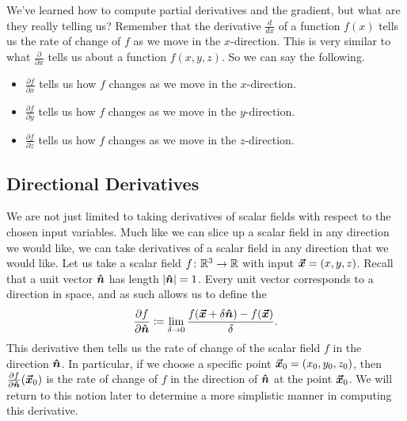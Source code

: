                         We've learned how to compute partial derivatives and the gradient, but what are they really telling us? Remember that the derivative $\frac{d}{dx}$ of a function $f(x)$ tells us the rate of change of $f$ as we move in the $x$-direction.  This is very similar to what $\frac{\partial}{\partial x}$ tells us about a function $f(x,y,z)$.  So we can say the following.
                        \begin{itemize}
                            \item $\frac{\partial f}{\partial x}$ tells us how $f$ changes as we move in the $x$-direction.
                            \item $\frac{\partial f}{\partial y}$ tells us how $f$ changes as we move in the $y$-direction.
                            \item $\frac{\partial f}{\partial z}$ tells us how $f$ changes as we move in the $z$-direction.
                        \end{itemize}   
                        
                        \subsection{Directional Derivatives}
                        
                        We are not just limited to taking derivatives of scalar fields with respect to the chosen input variables. Much like we can slice up a scalar field in any direction we would like, we can take derivatives of a scalar field in any direction that we would like. Let us take a scalar field $f \colon \mathbb{R}^3 \to \mathbb{R}$ with input $\boldsymbol{\vec{x}} = (x,y,z)$. Recall that a unit vector $\boldsymbol{\hat{n}}$ has length $|\boldsymbol{\hat{n}}|=1$. Every unit vector corresponds to a direction in space, and as such allows us to define the  
\[
\frac{\partial f}{\partial \boldsymbol{\hat{n}}} \coloneqq \lim_{\delta \to 0} \frac{f(\boldsymbol{\vec{x}}+\delta \boldsymbol{\hat{n}})-f(\boldsymbol{\vec{x}})}{\delta}.
\]
                This derivative then tells us the rate of change of the scalar field $f$ in the direction $\boldsymbol{\hat{n}}$. In particular, if we choose a specific point $\boldsymbol{\vec{x}}_0 = (x_0,y_0,z_0)$, then $\frac{\partial f}{\partial \boldsymbol{\hat{n}}}(\boldsymbol{\vec{x}}_0)$ is the rate of change of $f$ in the direction of $\boldsymbol{\hat{n}}$ at the point $\boldsymbol{\vec{x}}_0$. We will return to this notion later to determine a more simplistic manner in computing this derivative.

                                              
